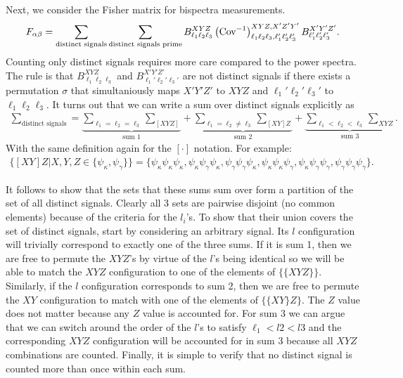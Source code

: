 \documentclass[11pt]{article} %
\DeclareRobustCommand{\Cov}{\ifmmode\text{Cov}\else d\fi}
\newcommand{\br}[1]{\ensuremath{\left( #1 \right)}}
\begin{document}
Next, we consider the Fisher matrix for bispectra measurements.
\begin{equation*}
    F_{\alpha\beta} = \sum_{\text{distinct signals}}\sum_{\text{distinct signals prime}} B^{XYZ}_{\ell_1\ell_2\ell_3}\br{\Cov^{-1}}^{XYZ,X'Z'Y'}_{\ell_1\ell_2\ell_3,\ell_1'\ell_2'\ell_3'}B^{X'Y'Z'}_{\ell_1'\ell_2'\ell_3'}.
\end{equation*} 
Counting only distinct signals requires more care compared to the power spectra. The rule is that $B^{XYZ}_{\ell_1\ell_2\ell_3}$ and $B^{X'Y'Z'}_{\ell_1'\ell_2'\ell_3'}$ are not distinct signals if there exists a permutation $\sigma$ that simultaniously maps $X'Y'Z'$ to $XYZ$ and $\ell_1'\ell_2'\ell_3'$ to $\ell_1\ell_2\ell_3$. It turns out that we can write a sum over distinct signals explicitly as
\begin{gather*}
    \sum_{\text{distinct signals}} = \underbrace{\sum_{\ell_1=\ell_2=\ell_3}\sum_{[XYZ]}}_{\text{sum }1} + \underbrace{\sum_{\ell_1=\ell_2\neq \ell_3}\sum_{[XY]Z}}_{\text{sum }2} + \underbrace{\sum_{\ell_1<\ell_2<\ell_3}\sum_{XYZ}}_{\text{sum }3}.
\end{gather*}
With the same definition again for the $[\cdot]$ notation. For example:
\begin{gather*}
    \{[XY]Z|X,Y,Z\in\{\psi_\kappa, \psi_\gamma\}\} = \{\psi_\kappa\psi_\kappa\psi_\kappa, \psi_\kappa\psi_\gamma\psi_\kappa, \psi_\gamma\psi_\gamma\psi_\kappa,\psi_\kappa\psi_\kappa\psi_\gamma, \psi_\kappa\psi_\gamma\psi_\gamma, \psi_\gamma\psi_\gamma\psi_\gamma\}.
\end{gather*}

It follows to show that the sets that these sums sum over form a partition of the set of all distinct signals. Clearly all 3 sets are pairwise disjoint (no common elements) because of the criteria for the $l_i$'s. To show that their union covers the set of distinct signals, start by considering an arbitrary signal. Its $l$ configuration will trivially correspond to exactly one of the three sums. If it is sum 1, then we are free to permute the $XYZ$'s by virtue of the $l$'s being identical so we will be able to match the $XYZ$ configuration to one of the elements of $\{\{XYZ\}\}$. Similarly, if the $l$ configuration corresponds to sum 2, then we are free to permute the $XY$ configuration to match with one of the elements of $\{\{XY\}Z\}$. The $Z$ value does not matter because any $Z$ value is accounted for. For sum 3 we can argue that we can switch around the order of the $l$'s to satisfy $\ell_1 < l2 < l3$ and the corresponding $XYZ$ configuration will be accounted for in sum 3 because all $XYZ$ combinations are counted. Finally, it is simple to verify that no distinct signal is counted more than once within each sum.
\end{document}
